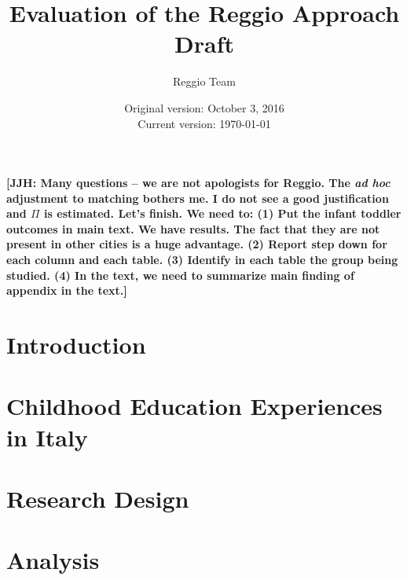 






\title{\Large \textbf{Evaluation of the Reggio Approach} \\ Draft}
\author{\normalsize Reggio Team}
\date{\normalsize Original version: October 3, 2016 \\ Current version: \today}
\maketitle

\textbf{[JJH: Many questions -- we are not apologists for Reggio. The \emph{ad hoc} adjustment to matching bothers me. I do not see a good justification and $\Pi$ is estimated. Let's finish. We need to: (1) Put the infant toddler outcomes in main text. We have results. The fact that they are not present in other cities is a huge advantage. (2) Report step down for each column and each table. (3) Identify in each table the group being studied. (4) In the text, we need to summarize main finding of appendix in the text.]}

\tableofcontents

\clearpage
\doublespacing

\section{Introduction}
\label{sec:introduction}


\section{Childhood Education Experiences in Italy}
\label{sec:ece-italy}


\section{Research Design}
\label{sec:data}




\section{Analysis}
\label{sec:methodology}
%


